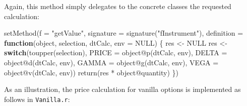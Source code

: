 \documentclass[justified]{tufte-book}
\newenvironment{Shaded}{}{}
\newcommand{\AttributeTok}[1]{\textcolor[rgb]{0.49,0.56,0.16}{#1}}
\newcommand{\ConstantTok}[1]{\textcolor[rgb]{0.53,0.00,0.00}{#1}}
\newcommand{\ControlFlowTok}[1]{\textcolor[rgb]{0.00,0.44,0.13}{\textbf{#1}}}
\newcommand{\FunctionTok}[1]{\textcolor[rgb]{0.02,0.16,0.49}{#1}}
\newcommand{\NormalTok}[1]{#1}
\newcommand{\OtherTok}[1]{\textcolor[rgb]{0.00,0.44,0.13}{#1}}
\newcommand{\SpecialCharTok}[1]{\textcolor[rgb]{0.25,0.44,0.63}{#1}}
\newcommand{\StringTok}[1]{\textcolor[rgb]{0.25,0.44,0.63}{#1}}
\newcommand{\code}[1]{\texttt{#1}\index{#1}}
\begin{document}
Again, this method simply delegates to the concrete classes the requested calculation:

\begin{Shaded}
\begin{Highlighting}[]
\FunctionTok{setMethod}\NormalTok{(}\AttributeTok{f =} \StringTok{"getValue"}\NormalTok{, }\AttributeTok{signature =} \FunctionTok{signature}\NormalTok{(}\StringTok{"fInstrument"}\NormalTok{),}
    \AttributeTok{definition =} \ControlFlowTok{function}\NormalTok{(object, selection, dtCalc,}
        \AttributeTok{env =} \ConstantTok{NULL}\NormalTok{) \{}
\NormalTok{        res }\OtherTok{\textless{}{-}} \ConstantTok{NULL}
\NormalTok{        res }\OtherTok{\textless{}{-}} \ControlFlowTok{switch}\NormalTok{(}\FunctionTok{toupper}\NormalTok{(selection), }\AttributeTok{PRICE =}\NormalTok{ object}\SpecialCharTok{@}\FunctionTok{p}\NormalTok{(dtCalc,}
\NormalTok{            env), }\AttributeTok{DELTA =}\NormalTok{ object}\SpecialCharTok{@}\FunctionTok{d}\NormalTok{(dtCalc, env), }\AttributeTok{GAMMA =}\NormalTok{ object}\SpecialCharTok{@}\FunctionTok{g}\NormalTok{(dtCalc,}
\NormalTok{            env), }\AttributeTok{VEGA =}\NormalTok{ object}\SpecialCharTok{@}\FunctionTok{v}\NormalTok{(dtCalc, env))}
        \FunctionTok{return}\NormalTok{(res }\SpecialCharTok{*}\NormalTok{ object}\SpecialCharTok{@}\NormalTok{quantity)}
\NormalTok{    \})}
\end{Highlighting}
\end{Shaded}

As an illustration, the price calculation for vanilla options is implemented as follows in
\code{Vanilla.r}:
\end{document}
